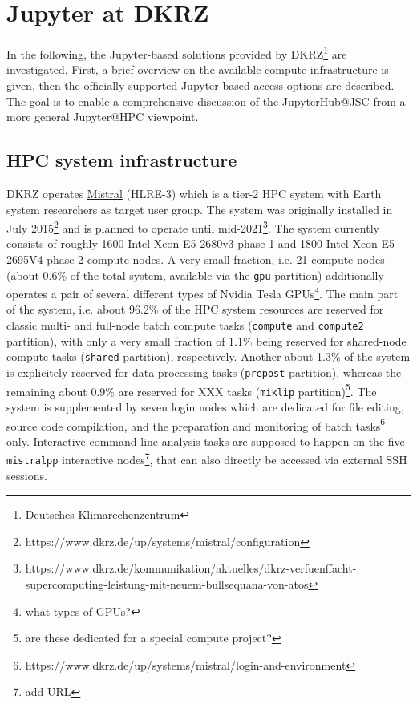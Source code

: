 \section{Jupyter at DKRZ}
\label{sect:jupyter-at-dkrz}

In the following, the Jupyter-based solutions provided by DKRZ\footnote{Deutsches Klimarechenzentrum} are investigated.
First, a brief overview on the available compute infrastructure is given, then the officially supported Jupyter-based access options are described.
The goal is to enable a comprehensive discussion of the JupyterHub@JSC from a more general Jupyter@HPC viewpoint.

\subsection{HPC system infrastructure}

DKRZ operates \href{https://www.dkrz.de/up/systems/mistral}{Mistral} (HLRE-3) which is a tier-2 HPC system \cite{Wissenschaftsrat2015, GaussAllianz2020} with Earth system researchers as target user group.
The system was originally installed in July 2015\footnote{https://www.dkrz.de/up/systems/mistral/configuration} and is planned to operate until mid-2021\footnote{https://www.dkrz.de/kommunikation/aktuelles/dkrz-verfuenffacht-supercomputing-leistung-mit-neuem-bullsequana-von-atos}.
The system currently consists of roughly 1600 Intel Xeon E5-2680v3 phase-1 and 1800 Intel Xeon E5-2695V4 phase-2 compute nodes.
A very small fraction, i.e. 21 compute nodes (about 0.6\% of the total system, available via the \verb|gpu| partition) additionally operates a pair of several different types of Nvidia Tesla GPUs\footnote{what types of GPUs?}.
The main part of the system, i.e. about 96.2\% of the HPC system resources are reserved for classic multi- and full-node batch compute tasks (\verb|compute| and \verb|compute2| partition), with only a very small fraction of 1.1\% being reserved for shared-node compute tasks (\verb|shared| partition), respectively.
Another about 1.3\% of the system is explicitely reserved for data processing tasks (\verb|prepost| partition), whereas the remaining about 0.9\% are reserved for XXX tasks (\verb|miklip| partition)\footnote{are these dedicated for a special compute project?}.
The system is supplemented by seven login nodes which are dedicated for file editing, source code compilation, and the preparation and monitoring of batch tasks\footnote{https://www.dkrz.de/up/systems/mistral/login-and-environment} only.
Interactive command line analysis tasks are supposed to happen on the five \verb|mistralpp| interactive nodes\footnote{add URL}, that can also directly be accessed via external SSH sessions.

